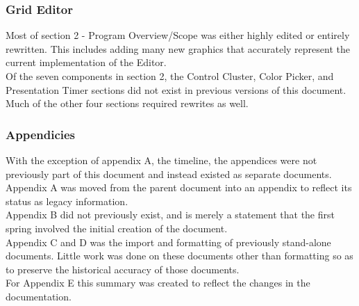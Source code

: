 \documentclass[12pt]{article}
\begin{document}
\begin{appendices}
          \subsubsection {Grid Editor}
            Most of section 2 - Program Overview/Scope was either highly edited or entirely rewritten.  This includes adding many new graphics that accurately represent the current implementation of the Editor.
            \\
            Of the seven components in section 2, the Control Cluster, Color Picker, and Presentation Timer sections did not exist in previous versions of this document. Much of the other four sections required rewrites as well.
        
        
        \subsubsection {Appendicies}
          With the exception of appendix A, the timeline, the appendices were not previously part of this document and instead existed as separate documents. 
          \\
          Appendix A was moved from the parent document into an appendix to reflect its status as legacy information.
          \\
          Appendix B did not previously exist, and is merely a statement that the first spring involved the initial creation of the document.
          \\
          Appendix C and D was the import and formatting of previously stand-alone documents. Little work was done on these documents other than formatting so as to preserve the historical accuracy of those documents.
          \\
          For Appendix E this summary was created to reflect the changes in the documentation.
      
      \clearpage

    
  \end{appendices}
\end{document}
